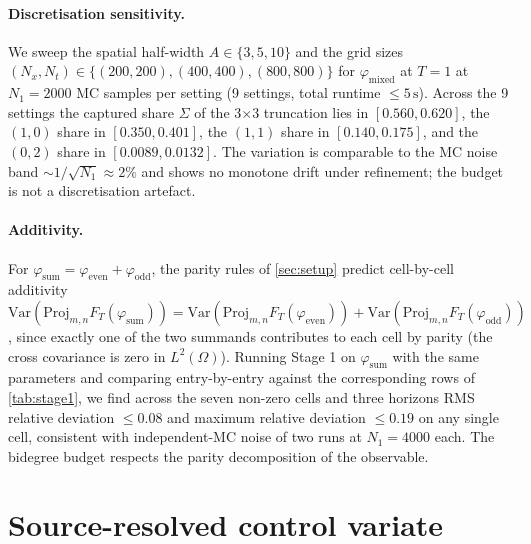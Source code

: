 \documentclass[11pt,reqno]{amsart}
\theoremstyle{plain}
\theoremstyle{definition}
\theoremstyle{remark}
\newcommand{\Var}{\mathrm{Var}}
\newcommand{\Proj}{\mathrm{Proj}}
\begin{document}
\paragraph{Discretisation sensitivity.}
We sweep the spatial half-width $A \in \{3, 5, 10\}$ and the grid
sizes $(N_x, N_t) \in \{(200, 200), (400, 400), (800, 800)\}$ for
$\varphi_{\mathrm{mixed}}$ at $T = 1$ at $N_1 = 2000$ MC samples per
setting (9 settings, total runtime $\le 5\,\mathrm{s}$). Across the
9 settings the captured share $\Sigma$ of the 3$\times$3 truncation
lies in $[0.560, 0.620]$, the $(1, 0)$ share in $[0.350, 0.401]$,
the $(1, 1)$ share in $[0.140, 0.175]$, and the $(0, 2)$ share in
$[0.0089, 0.0132]$. The variation is comparable to the MC noise
band $\sim 1/\sqrt{N_1} \approx 2\%$ and shows no monotone drift
under refinement; the budget is not a discretisation artefact.

\paragraph{Additivity.}
For $\varphi_{\mathrm{sum}} = \varphi_{\mathrm{even}} + \varphi_{\mathrm{odd}}$,
the parity rules of \cref{sec:setup} predict cell-by-cell additivity
$\Var(\Proj_{m, n} F_T(\varphi_{\mathrm{sum}}))
 = \Var(\Proj_{m, n} F_T(\varphi_{\mathrm{even}}))
 + \Var(\Proj_{m, n} F_T(\varphi_{\mathrm{odd}}))$,
since exactly one of the two summands contributes to each cell by
parity (the cross covariance is zero in $L^2(\Omega)$). Running
Stage 1 on $\varphi_{\mathrm{sum}}$ with the same parameters and
comparing entry-by-entry against the corresponding rows of
\cref{tab:stage1}, we find across the seven non-zero cells and
three horizons RMS relative deviation $\le 0.08$ and maximum
relative deviation $\le 0.19$ on any single cell, consistent with
independent-MC noise of two runs at $N_1 = 4000$ each. The bidegree
budget respects the parity decomposition of the observable.

\section{Source-resolved control variate}
\label{sec:control-variate}
\end{document}

